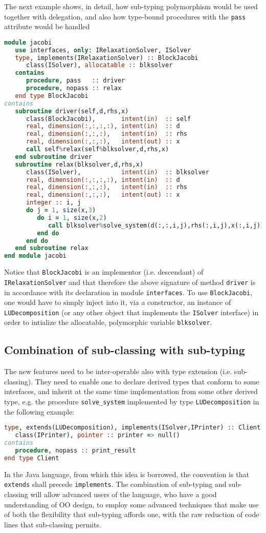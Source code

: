 \documentclass[11pt,oneside]{article}
\begin{document}
The next example shows, in detail, how sub-typing polymorphism would
be used together with delegation, and also how type-bound procedures
with the \texttt{pass} attribute would be handled
\begin{lstlisting}[language=Fortran]
module jacobi
   use interfaces, only: IRelaxationSolver, ISolver
   type, implements(IRelaxationSolver) :: BlockJacobi
      class(ISolver), allocatable :: blksolver
   contains
      procedure, pass   :: driver
      procedure, nopass :: relax
   end type BlockJacobi
contains
   subroutine driver(self,d,rhs,x)
      class(BlockJacobi),       intent(in)  :: self
      real, dimension(:,:,:,:), intent(in)  :: d
      real, dimension(:,:,:),   intent(in)  :: rhs
      real, dimension(:,:,:),   intent(out) :: x
      call self%relax(self%blksolver,d,rhs,x)
   end subroutine driver
   subroutine relax(blksolver,d,rhs,x)
      class(ISolver),           intent(in)  :: blksolver
      real, dimension(:,:,:,:), intent(in)  :: d
      real, dimension(:,:,:),   intent(in)  :: rhs
      real, dimension(:,:,:),   intent(out) :: x
      integer :: i, j
      do j = 1, size(x,3)
         do i = 1, size(x,2)
            call blksolver%solve_system(d(:,:,i,j),rhs(:,i,j),x(:,i,j))
         end do
      end do
   end subroutine relax
end module jacobi
\end{lstlisting}
Notice that \texttt{BlockJacobi} is an implementor (i.e. descendant)
of \texttt{IRelaxationSolver} and that therefore the above signature
of method \texttt{driver} is in accordance with its declaration in
module \texttt{interfaces}. To use \texttt{BlockJacobi}, one would
have to simply inject into it, via a constructor, an instance of
\texttt{LUDecomposition} (or any other object that implements the
\texttt{ISolver} interface) in order to intialize the allocatable,
polymorphic variable \texttt{blksolver}.

\subsection{Combination of sub-classing with sub-typing}

The new features need to be inter-operable also with type extension
(i.e. sub-classing). They need to enable one to declare derived types
that conform to some interfaces, and inherit at the same time
implementation from some other derived type, e.g. the procedure
\texttt{solve\_system} implemented by type \texttt{LUDecomposition} in
the following example:
\begin{lstlisting}[language=Fortran]
type, extends(LUDecomposition), implements(ISolver,IPrinter) :: Client
   class(IPrinter), pointer :: printer => null()
contains
   procedure, nopass :: print_result
end type Client
\end{lstlisting}
In the Java language, from which this idea is borrowed, the convention
is that \texttt{extends} shall precede \texttt{implements}. The
combination of sub-typing and sub-classing will allow advanced users
of the language, who have a good understanding of OO design, to employ
some advanced techniques that make use of both the flexibility that
sub-typing affords one, with the raw reduction of code lines that
sub-classing permits.
\end{document}
